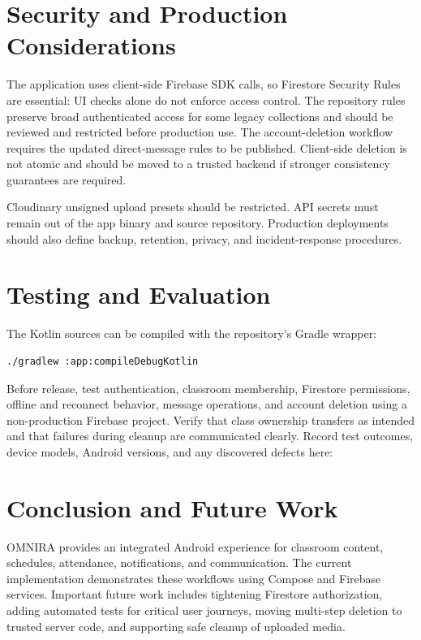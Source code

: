 \documentclass[12pt,a4paper]{report}
\begin{document}
\chapter{Security and Production Considerations}
The application uses client-side Firebase SDK calls, so Firestore Security Rules are
essential: UI checks alone do not enforce access control. The repository rules preserve
broad authenticated access for some legacy collections and should be reviewed and
restricted before production use. The account-deletion workflow requires the updated
direct-message rules to be published. Client-side deletion is not atomic and should be
moved to a trusted backend if stronger consistency guarantees are required.

Cloudinary unsigned upload presets should be restricted. API secrets must remain out
of the app binary and source repository. Production deployments should also define
backup, retention, privacy, and incident-response procedures.

\chapter{Testing and Evaluation}
The Kotlin sources can be compiled with the repository's Gradle wrapper:

\begin{lstlisting}[language=bash]
./gradlew :app:compileDebugKotlin
\end{lstlisting}

Before release, test authentication, classroom membership, Firestore permissions,
offline and reconnect behavior, message operations, and account deletion using a
non-production Firebase project. Verify that class ownership transfers as intended
and that failures during cleanup are communicated clearly. Record test outcomes,
device models, Android versions, and any discovered defects here:

\vspace{1em}

\chapter{Conclusion and Future Work}
OMNIRA provides an integrated Android experience for classroom content, schedules,
attendance, notifications, and communication. The current implementation demonstrates
these workflows using Compose and Firebase services. Important future work includes
tightening Firestore authorization, adding automated tests for critical user journeys,
moving multi-step deletion to trusted server code, and supporting safe cleanup of
uploaded media.
\end{document}
